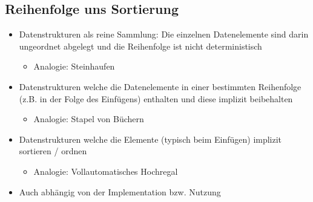 \subsection{Reihenfolge uns Sortierung}
\begin{itemize}[noitemsep,topsep=0pt,leftmargin=*]
    \item Datenstrukturen als reine Sammlung: Die einzelnen Datenelemente sind darin ungeordnet abgelegt und die Reihenfolge ist nicht deterministisch
    \begin{itemize}[noitemsep,topsep=0pt,leftmargin=*]
        \item Analogie: Steinhaufen
    \end{itemize}
    \item Datenstrukturen welche die Datenelemente in einer bestimmten Reihenfolge (z.B. in der Folge des Einfügens) enthalten und diese implizit beibehalten
    \begin{itemize}[noitemsep,topsep=0pt,leftmargin=*]
        \item Analogie: Stapel von Büchern
    \end{itemize}
    \item Datenstrukturen welche die Elemente (typisch beim Einfügen) implizit sortieren / ordnen
    \begin{itemize}[noitemsep,topsep=0pt,leftmargin=*]
        \item Analogie: Vollautomatisches Hochregal
    \end{itemize}
    \item Auch abhängig von der Implementation bzw. Nutzung
\end{itemize}

